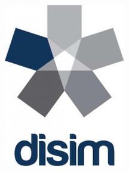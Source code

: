 \begin{figure}[h]
\begin{minipage}[t]{0.15\textwidth}
        \includegraphics[width=\textwidth]{./img/disim_logo_descr.png}
    \end{minipage}
\end{figure}

\vspace{1.5cm}

